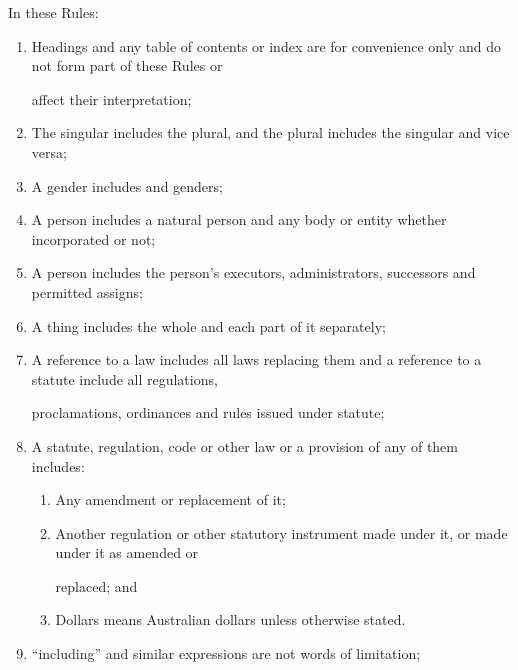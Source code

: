 \documentclass{article}
\begin{document}
\begin{enumerate}[label=\arabic*.]
\begin{enumerate}[label=\arabic{enumi}.\arabic*.]
{\fontsize{10.02}{1}In these Rules: }

\begin{enumerate}[label=(\arabic*)]
\item {\fontsize{9.962}{1} Headings and any table of contents or index are for convenience only and do not form part of these Rules or }

{\fontsize{10.02}{1}affect their interpretation; }

\item {\fontsize{9.962}{1} The singular includes the plural, and the plural includes the singular and vice versa; }

\item {\fontsize{9.962}{1} A gender includes and genders; }

\item {\fontsize{9.962}{1} A person includes a natural person and any body or entity whether incorporated or not; }

\item {\fontsize{9.962}{1} A person includes the person’s executors, administrators, successors and permitted assigns; }

\item {\fontsize{9.962}{1} A thing includes the whole and each part of it separately; }

\item {\fontsize{9.962}{1} A reference to a law includes all laws replacing them and a reference to a statute include all regulations, }

{\fontsize{10.02}{1}proclamations, ordinances and rules issued under statute; }

\item {\fontsize{9.962}{1} A statute, regulation, code or other law or a provision of any of them includes: }

\begin{enumerate}[label=(\alph*)]
\item {\fontsize{9.962}{1} Any amendment or replacement of it; }

\item {\fontsize{9.962}{1} Another regulation or other statutory instrument made under it, or made under it as amended or }

{\fontsize{10.02}{1}replaced; and }

\item {\fontsize{9.962}{1} Dollars means Australian dollars unless otherwise stated. }

\end{enumerate}
\item {\fontsize{9.962}{1} “including” and similar expressions are not words of limitation; }


\end{enumerate}
\end{enumerate}
\end{enumerate}
\end{document}
